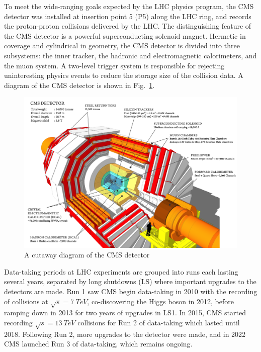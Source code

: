 

To meet the wide-ranging goals expected by the LHC physics program, the CMS detector \cite{CMSTDR} was installed at insertion point 5 (P5) along the LHC ring, and records the proton-proton collisions delivered by the LHC. The distinguishing feature of the CMS detector is a powerful superconducting solenoid magnet. Hermetic in coverage and cylindrical in geometry, the CMS detector is divided into three subsystems: the inner tracker, the hadronic and electromagnetic calorimeters, and the muon system. A two-level trigger system is responsible for rejecting uninteresting physics events to reduce the storage size of the collision data. A diagram of the CMS detector is shown in Fig.~\ref{fig:CMSDiagram}.

\begin{figure}[H]
    \centering
    \includegraphics[width=1\textwidth]{Images/CMS/CMSDiagram.png}
    \caption{A cutaway diagram of the CMS detector}
    \label{fig:CMSDiagram}
\end{figure}

Data-taking periods at LHC experiments are grouped into runs each lasting several years, separated by long shutdowns (LS) where important upgrades to the detectors are made. Run 1 saw CMS begin data-taking in 2010 with the recording of collisions at $\sqrt{s}=\SI{7}{TeV}$, co-discovering the Higgs boson in 2012, before ramping down in 2013 for two years of upgrades in LS1. In 2015, CMS started recording $\sqrt{s}=\SI{13}{TeV}$ collisions for Run 2 of data-taking which lasted until 2018. Following Run 2, more upgrades to the detector were made, and in 2022 CMS launched Run 3 of data-taking, which remains ongoing.


